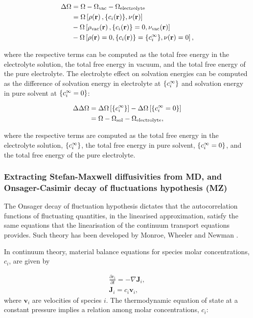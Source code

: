 \documentclass[../main.tex]{subfiles}
\begin{document}
\begin{align}
    \Delta\Omega &=\Omega-\Omega_{\textrm{vac}}-\Omega_{\textrm{electrolyte}} \\
    &=\Omega\left[\dens\ofrvec,\{\ci\ofrvec\},\pot\ofrvec\right] \\
    \nonumber
    &-\Omega\left[\dens_{\textrm{vac}}\ofrvec,\{\ci\ofrvec\}=0,\pot_{\textrm{vac}}\ofrvec\right] \\
    \nonumber
    &-\Omega\left[\dens\ofrvec=0,\{\ci\ofrvec\}=\{\cif\},\pot\ofrvec=0\right]
    \nonumber,
\end{align}

where the respective terms can be computed as the total free energy in the electrolyte solution, the total free energy in vacuum, and the total free energy of the pure electrolyte.\cite{Dziedzic2020} The electrolyte effect on solvation energies can be computed as the difference of solvation energy in electrolyte at $\{c_i^{\infty}\}$ and solvation energy in pure solvent at $\{c_i^{\infty}=0\}$:

\begin{align}
    \Delta\Delta\Omega    &= \Delta\Omega\left[{\{c_i^{\infty}\}}\right]-\Delta\Omega\left[{\{c_i^{\infty}=0\}}\right] \\
    &= \Omega - \Omega_{\textrm{sol}} - \Omega_{\textrm{electrolyte}},
\end{align}

where the respective terms are computed as the total free energy in the electrolyte solution, $\{c_i^{\infty}\}$, the total free energy in pure solvent, $\{c_i^{\infty}=0\}$, and the total free energy of the pure electrolyte. 



\subsubsection{Extracting Stefan-Maxwell diffusivities from MD, and Onsager-Casimir decay of fluctuations hypothesis (MZ)}
\label{sec:stefan-maxwell}
The Onsager decay of fluctuation hypothesis dictates that the autocorrelation functions of fluctuating quantities, in the linearised approximation, satisfy the same equations that the linearisation of the continuum transport equations provides. Such theory has been developed by Monroe, Wheeler and Newman
\cite{mwn2006,mwn2009,mwn2015} .

In continuum theory, material balance equations for species molar concentrations, $c_i$, are given by

\begin{equation} \begin{array}{l}
    \displaystyle \frac{\partial c_i}{\partial t} = - \nabla \mathbf{J}_i  ,
    \\
    \mathbf{J}_i  = c_i \mathbf{v}_i ,
    \label{massbalance}
\end{array} \end{equation}
\noindent where $\mathbf{v}_i$ are velocities of species $i$. The thermodynamic equation of state at a constant pressure implies a relation among molar concentrations, $c_i$:
\end{document}
